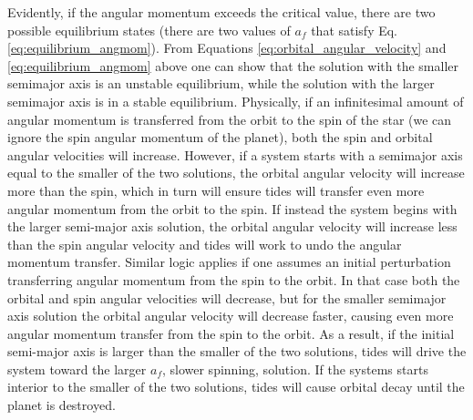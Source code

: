 Evidently, if the angular momentum exceeds the critical value, there are two
possible equilibrium states (there are two values of $a_f$ that satisfy Eq.
\eqref{eq:equilibrium_angmom}). From Equations
\eqref{eq:orbital_angular_velocity} and \eqref{eq:equilibrium_angmom} above one
can show that the solution with the smaller semimajor axis is an unstable
equilibrium, while the solution with the larger semimajor axis is in a stable
equilibrium. Physically, if an infinitesimal amount of angular momentum is
transferred from the orbit to the spin of the star (we can ignore the spin
angular momentum of the planet), both the spin and orbital angular velocities
will increase.  However, if a system starts with a semimajor axis equal to the
smaller of the two solutions, the orbital angular velocity will increase more
than the spin, which in turn will ensure tides will transfer even more angular
momentum from the orbit to the spin. If instead the system begins with the
larger semi-major axis solution, the orbital angular velocity will increase less
than the spin angular velocity and tides will work to undo the angular momentum
transfer.  Similar logic applies if one assumes an initial perturbation
transferring angular momentum from the spin to the orbit. In that case both the
orbital and spin angular velocities will decrease, but for the smaller semimajor
axis solution the orbital angular velocity will decrease faster, causing even
more angular momentum transfer from the spin to the orbit. As a result, if the
initial semi-major axis is larger than the smaller of the two solutions, tides
will drive the system toward the larger $a_f$, slower spinning, solution. If the
systems starts interior to the smaller of the two solutions, tides will cause
orbital decay until the planet is destroyed.

